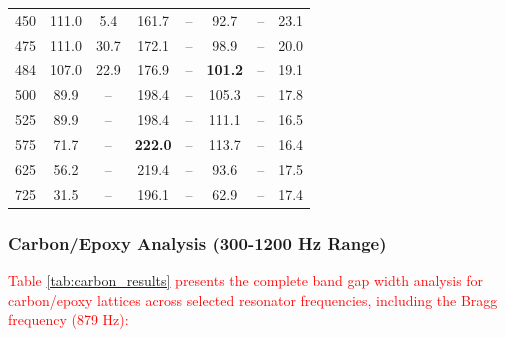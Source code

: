 \documentclass[review,numbers,sort&compress]{elsarticle}
\begin{document}
{\begin{table}[!htb]
\begin{tabular}{cccccccc}
450 & 111.0 & 5.4 & 161.7 & -- & 92.7 & -- & 23.1 \\
475 & 111.0 & 30.7 & 172.1 & -- & 98.9 & -- & 20.0 \\
484\protect\footnotemark[2] & 107.0 & 22.9 & 176.9 & -- & \textbf{101.2} & -- & 19.1 \\
500 & 89.9 & -- & 198.4 & -- & 105.3 & -- & 17.8 \\
525 & 89.9 & -- & 198.4 & -- & 111.1 & -- & 16.5 \\
575 & 71.7 & -- & \textbf{222.0} & -- & 113.7 & -- & 16.4 \\
625 & 56.2 & -- & 219.4 & -- & 93.6 & -- & 17.5 \\
725 & 31.5 & -- & 196.1 & -- & 62.9 & -- & 17.4 \\
\hline
\end{tabular}
\end{table}}

\subsubsection{Carbon/Epoxy Analysis (300-1200 Hz Range)}

\textcolor{red}{Table \ref{tab:carbon_results} presents the complete band gap width analysis for carbon/epoxy lattices across selected resonator frequencies, including the Bragg frequency (879 Hz):}
\end{document}
